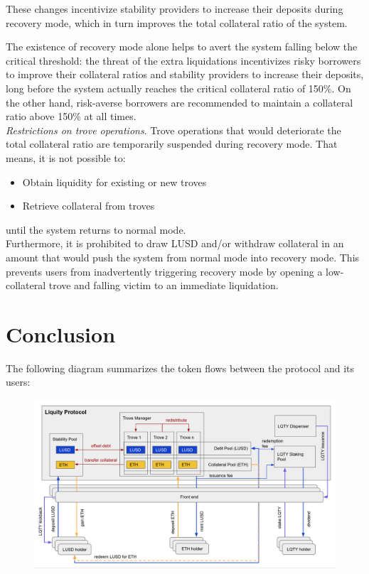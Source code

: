 \documentclass{article}
\begin{document}
These changes incentivize stability providers to increase their deposits during recovery mode, which in turn improves the total collateral ratio of the system.

The existence of recovery mode alone helps to avert the system falling below the critical threshold: the threat of the extra liquidations incentivizes risky borrowers to improve their collateral ratios and stability providers to increase their deposits, long before the system actually reaches the critical collateral ratio of 150\%. On the other hand, risk-averse borrowers are recommended to maintain a collateral ratio above 150\% at all times.\\

\textit{Restrictions on trove operations}. Trove operations that would deteriorate the total collateral ratio are temporarily suspended during recovery mode. That means, it is not possible to:
\begin{itemize}
    \item Obtain liquidity for existing or new troves
    \item Retrieve collateral from troves
\end{itemize}
until the system returns to normal mode.\\

Furthermore, it is prohibited to draw LUSD and/or withdraw collateral in an amount that would push the system from normal mode into recovery mode. This prevents users from inadvertently triggering recovery mode by opening a low-collateral trove and falling victim to an immediate liquidation.

\section{Conclusion}
The following diagram summarizes the token flows between the protocol and its users:\\

\begin{figure}[ht]
\centering
\includegraphics[width=16cm]{a14.png}
\end{figure}
\end{document}
